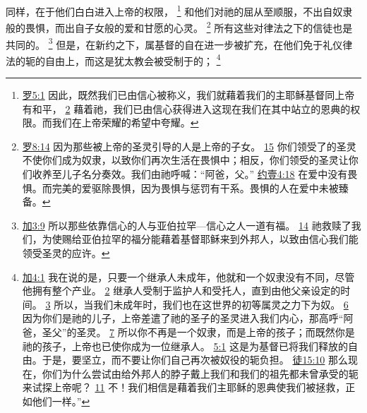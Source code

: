 \documentclass[12pt, a4paper, oneside]{ctexart}
\begin{document}
	同样，在于他们白白进入上帝的权限，
	\footnote {
		\href{https://biblehub.com/romans/5-1.htm}{罗5:1} 因此，既然我们已由信心被称义，我们就藉着我们的主耶稣基督同上帝有和平，
		\href{https://biblehub.com/romans/5-2.htm}{2} 藉着祂，我们已由信心获得进入这现在我们在其中站立的恩典的权限。而我们在上帝荣耀的希望中夸耀。

	}
	和他们对祂的屈从至顺服，不出自奴隶般的畏惧，而出自子女般的爱和甘愿的心灵。
	\footnote {
		\href{https://biblehub.com/romans/8-14.htm}{罗8:14} 因为那些被上帝的圣灵引导的人是上帝的子女。
		\href{https://biblehub.com/romans/8-15.htm}{15} 你们领受了的圣灵不使你们成为奴隶，以致你们再次生活在畏惧中；相反，你们领受的圣灵让你们收养至儿子名分奏效。我们由祂呼喊：“阿爸，父。”
		\href{https://biblehub.com/1_john/4-18.htm}{约壹4:18} 在爱中没有畏惧。而完美的爱驱除畏惧，因为畏惧与惩罚有干系。畏惧的人在爱中未被臻备。
	}
	所有这些对律法之下的信徒也是共同的。
	\footnote {
		\href{https://biblehub.com/galatians/3-9.htm}{加3:9} 所以那些依靠信心的人与亚伯拉罕---信心之人一道有福。
		\href{https://biblehub.com/galatians/3-14.htm}{14} 祂救赎了我们，为使赐给亚伯拉罕的福分能藉着基督耶稣来到外邦人，以致由信心我们能领受圣灵的应许。
	}
	但是，在新约之下，属基督的自在进一步被扩充，在他们免于礼仪律法的轭的自由上，而这是犹太教会被受制于的；
	\footnote {
		\href{https://biblehub.com/galatians/4-1.htm}{加4:1} 我在说的是，只要一个继承人未成年，他就和一个奴隶没有不同，尽管他拥有整个产业。
		\href{https://biblehub.com/galatians/4-2.htm}{2} 继承人受制于监护人和受托人，直到由他父亲设定的时间。
		\href{https://biblehub.com/galatians/4-3.htm}{3} 所以，当我们未成年时，我们也在这世界的初等属灵之力下为奴。
		\href{https://biblehub.com/galatians/4-6.htm}{6} 因为你们是祂的儿子，上帝差遣了祂的圣子的圣灵进入我们内心，那高呼“阿爸，圣父”的圣灵。
		\href{https://biblehub.com/galatians/4-7.htm}{7} 所以你不再是一个奴隶，而是上帝的孩子；而既然你是祂的孩子，上帝也已使你成为一位继承人。
		\href{https://biblehub.com/galatians/5-1.htm}{5:1} 这是为基督已将我们释放的自由。于是，要坚立，而不要让你们自己再次被奴役的轭负担。
		\href{https://biblehub.com/acts/15-10.htm}{徒15:10} 那么现在，你们为什么尝试由给外邦人的脖子戴上我们和我们的祖先都未曾承受的轭来试探上帝呢？
		\href{https://biblehub.com/acts/15-11.htm}{11} 不！我们相信是藉着我们主耶稣的恩典使我们被拯救，正如他们一样。”
	}
\end{document}
